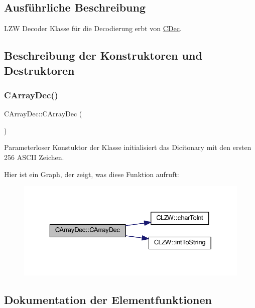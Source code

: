 \subsection{Ausführliche Beschreibung}
L\+ZW Decoder Klasse für die Decodierung erbt von \hyperlink{class_c_dec}{C\+Dec}. 

\subsection{Beschreibung der Konstruktoren und Destruktoren}
\mbox{\label{class_c_array_dec_a23b04c4bfd814351394427a5c867514b}} 
\subsubsection{\texorpdfstring{C\+Array\+Dec()}{CArrayDec()}}
{\footnotesize\ttfamily C\+Array\+Dec\+::\+C\+Array\+Dec (\begin{DoxyParamCaption}{ }\end{DoxyParamCaption})}



Parameterloser Konstuktor der Klasse initialisiert das Dicitonary mit den ersten 256 A\+S\+C\+II Zeichen. 

Hier ist ein Graph, der zeigt, was diese Funktion aufruft\+:
\nopagebreak
\begin{figure}[H]
\begin{center}
\leavevmode
\includegraphics[width=329pt]{class_c_array_dec_a23b04c4bfd814351394427a5c867514b_cgraph}
\end{center}
\end{figure}


\subsection{Dokumentation der Elementfunktionen}
\mbox{\label{class_c_array_dec_a59b83f47506de60b41728d6889d5643a}} 
